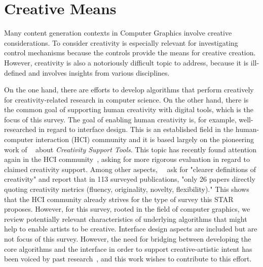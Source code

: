 

\section{Creative Means}\label{sec:creativ_means}

Many content generation contexts in Computer Graphics involve creative considerations. To consider creativity is especially relevant for investigating control mechanisms because the controls provide the means for creative creation. However, creativity is also a notoriously difficult topic to address, because it is ill-defined and involves insights from various disciplines.

On the one hand, there are efforts to develop algorithms that perform creatively for creativity-related research in computer science. On the other hand, there is the common goal of supporting human creativity with digital tools, which is the focus of this survey. The goal of enabling human creativity is, for example, well-researched in regard to interface design. This is an established field in the human-computer interaction (HCI) community and it is based largely on the pioneering work of \citeauthor*{shneiderman_2007_cst}~\cite{shneiderman_2007_cst} about \textit{Creativity Support Tools}. This topic has recently found attention again in the HCI community~\cite{frich_2018_tyo, frich_2019_mtl, remy_2020_ecs}, asking for more rigorous evaluation in regard to claimed creativity support. Among other aspects,~\citeauthor*{frich_2018_tyo}~\cite{frich_2018_tyo} ask for "clearer definitions of creativity" and report that in 113 surveyed publications, "only 26 papers directly quoting creativity metrics (\eg fluency, originality, novelty, flexibility)." This shows that the HCI community already strives for the type of survey this STAR proposes. However, for this survey, rooted in the field of computer graphics, we review potentially relevant characteristics of underlying algorithms that might help to enable artists to be creative. Interface design aspects are included but are not focus of this survey. However, the need for bridging between developing the core algorithms and the interface in order to support creative-artistic intent has been voiced by past research~\cite{deterding_2017_mci,isenberg_2016_inw, salesin_2002_nar}, and this work wishes to contribute to this effort.


